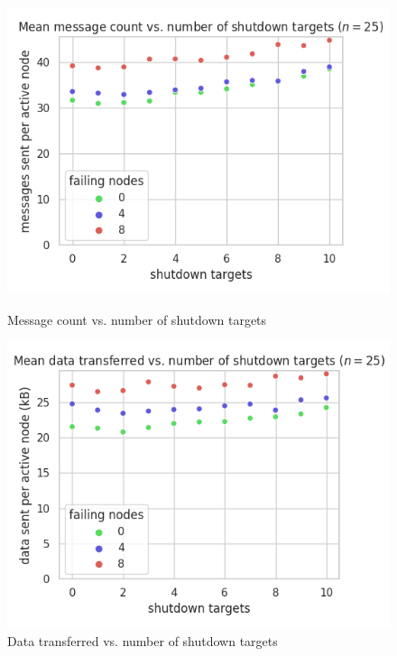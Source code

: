 \begin{figure}[H]
    \centering
    \begin{minipage}{0.5\textwidth}
        \centering
        \includegraphics[width=\textwidth]{figures/8/bandwidth_msg_tx_sum_by_shutdown_targets.png}
        \captionsetup{labelformat=empty}
        \caption{Message count vs. number of shutdown targets}
    \end{minipage}\hfill
    \begin{minipage}{0.5\textwidth}
        \centering
        \includegraphics[width=\textwidth]{figures/8/bandwidth_tx_sum_by_shutdown_targets.png}
        \captionsetup{labelformat=empty}
        \caption{Data transferred vs. number of shutdown targets}
    \end{minipage}\hfill
\end{figure}


